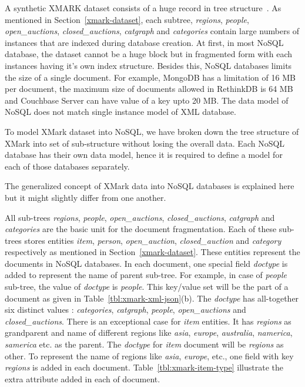 A synthetic XMARK dataset consists of a huge record in tree structure~\citep{xmark/VIST}. As mentioned in Section~\ref{xmark-dataset}, each subtree, \textit{regions}, \textit{people}, \textit{open\_auctions}, \textit{closed\_auctions}, \textit{catgraph} and \textit{categories} contain large numbers of instances that are indexed during database creation. At first, in most NoSQL database, the dataset cannot be a huge block but in fragmented form with each instances having it's own index structure. Besides this, NoSQL databases limits the size of a single document. For example, MongoDB has a limitation of 16 MB per document, the maximum size of documents allowed in RethinkDB is 64 MB and Couchbase Server can have value of a key upto 20 MB. The data model of NoSQL does not match single instance model of XML database.
\par 
To model XMark dataset into NoSQL, we have broken down the tree structure of XMark into set of sub-structure without losing the overall data. Each NoSQL database has their own data model, hence it is required to define a model for each of those databases separately.

The generalized concept of  XMark data into NoSQL databases is explained here but it might slightly differ from one another. 

All sub-trees \textit{regions}, \textit{people}, \textit{open\_auctions}, \textit{closed\_auctions}, \textit{catgraph} and \textit{categories} are the basic unit for the document fragmentation. Each of these sub-trees stores entities \textit{item}, \textit{person}, \textit{open\_auction}, \textit{closed\_auction} and \textit{category} respectively as mentioned in Section~\ref{xmark-dataset}. These entities represent the documents in NoSQL databases. In each document, one special field \textit{doctype} is added to represent the name of parent sub-tree. For example, in case of \textit{people} sub-tree, the value of \textit{doctype} is \textit{people}. This key/value set will be the part of a document as  given in Table~\ref{tbl:xmark-xml-json}(b). The \textit{doctype} has all-together six distinct values : \textit{categories}, \textit{catgraph}, \textit{people}, \textit{open\_auctions} and \textit{closed\_auctions}. There is an exceptional case for \textit{item} entities. It has \textit{regions} as grandparent and name of different regions like \textit{asia}, \textit{europe}, \textit{australia}, \textit{namerica}, \textit{samerica} etc. as the parent.  The \textit{doctype} for \textit{item} document will be \textit{regions} as other. To represent the name of regions like \textit{asia}, \textit{europe}, etc.,  one field with key \textit{regions} is added in each document. 
Table~\ref{tbl:xmark-item-type} illustrate the extra attribute added in each of document.

